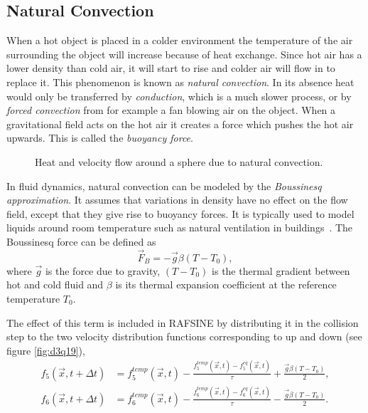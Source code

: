 \subsection{Natural Convection}\label{sec:natural_convection}
When a hot object is placed in a colder environment the temperature of the air surrounding the object will increase because of heat exchange. Since hot air has a lower density than cold air, it will start to rise and colder air will flow in to replace it. This phenomenon is known as \textit{natural convection}. In its absence heat would only be transferred by \textit{conduction}, which is a much slower process, or by \textit{forced convection} from for example a fan blowing air on the object. When a gravitational field acts on the hot air it creates a force which pushes the hot air upwards. This is called the \textit{buoyancy force}. 

\begin{figure}[H]
\centering
\begin{small}
\def\svgwidth{0.5\linewidth}

\end{small}
\caption{Heat and velocity flow around a sphere due to natural convection.}
\label{fig:natural_convection}
\end{figure}

In fluid dynamics, natural convection can be modeled by the \textit{Boussinesq approximation}. It assumes that variations in density have no effect on the flow field, except that they give rise to buoyancy forces. It is typically used to model liquids around room temperature such as natural ventilation in buildings~\cite{comsol_boussinesq}. The Boussinesq force can be defined as~\cites[pg.144]{Delbosc}
\begin{equation}
\vec{F}_B = -\vec{g}\beta(T-T_0),
\end{equation}
where $\vec{g}$ is the force due to gravity, $(T-T_0)$ is the thermal gradient between hot and cold fluid and $\beta$ is its thermal expansion coefficient at the reference temperature $T_0$.

The effect of this term is included in RAFSINE by distributing it in the collision step to the two velocity distribution functions corresponding to up and down (see figure \ref{fig:d3q19}),
\begin{align}
f_5(\vec{x}, t+\Delta t) &= f_5^{temp}(\vec{x},t) - \frac{f_5^{temp}(\vec{x},t)-f_5^{eq}(\vec{x},t)}{\tau} + \frac{\vec{g}\beta(T-T_0)}{2},\\
f_6(\vec{x}, t+\Delta t) &= f_6^{temp}(\vec{x},t) - \frac{f_6^{temp}(\vec{x},t)-f_6^{eq}(\vec{x},t)}{\tau} - \frac{\vec{g}\beta(T-T_0)}{2}.
\end{align}

